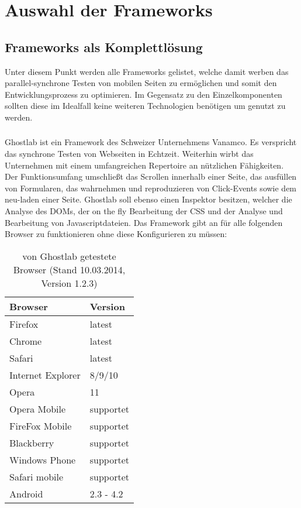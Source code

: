 \chapter{Auswahl der Frameworks}

\section{Frameworks als Komplettlösung}
Unter diesem Punkt werden alle Frameworks gelistet, welche damit werben das parallel-synchrone Testen von mobilen Seiten zu ermöglichen und somit den Entwicklungsprozess zu optimieren. Im Gegensatz zu den Einzelkomponenten sollten diese im Idealfall keine weiteren Technologien benötigen um genutzt zu werden.
	\subsection{}
	Ghostlab ist ein Framework des Schweizer Unternehmens Vanamco. Es verspricht das synchrone Testen von Webseiten in 		Echtzeit. Weiterhin wirbt das Unternehmen mit einem umfangreichen Repertoire an nützlichen Fähigkeiten. Der 				Funktionsumfang umschließt das Scrollen innerhalb einer Seite, das ausfüllen von  Formularen, das wahrnehmen und 			reproduzieren von Click-Events sowie dem neu-laden einer Seite. Ghostlab soll ebenso einen Inspektor besitzen, welcher die 		Analyse des DOMs, der on the fly Bearbeitung der CSS und der Analyse und Bearbeitung von Javascriptdateien. Das 			Framework gibt an für alle folgenden Browser zu funktionieren ohne diese Konfigurieren zu müssen:

	\begin{table}[H]
 		\centering
			\begin{tabular}{| p{5cm} | p{5cm} |}
			
			\hline
				Browser 	& 	Version\\
			\hline
			\hline
				Firefox	&	latest\\
				Chrome	&	latest\\
				Safari	&	latest\\
				Internet Explorer	&	8/9/10\\
				Opera	&	11\\
				Opera Mobile	&	supportet\\
				FireFox Mobile	&	supportet\\
				Blackberry	&	supportet\\
				Windows Phone	&	supportet\\
				Safari mobile	&	supportet\\	
				Android	&	2.3 - 4.2\\
				\hline
				\end{tabular}
			\caption{von Ghostlab getestete Browser (Stand 10.03.2014, Version 1.2.3)}
	\end{table}

